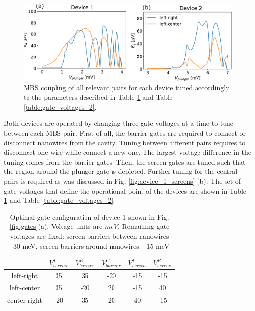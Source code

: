 \begin{figure}[h!]
\centering
  \includegraphics[width=0.8\linewidth]{figures/device_couplings.pdf}
  \caption{MBS coupling of all relevant pairs for each device tuned accordingly to the parameters described in Table \ref{table:gate_voltages_1} and Table \ref{table:gate_voltages_2}.}
  \label{fig:devices_coupling}
\end{figure}

Both devices are operated by changing three gate voltages at a time to tune between each MBS pair.
First of all, the barrier gates are required to connect or disconnect nanowires from the cavity.
Tuning between different pairs requires to disconnect one wire while connect a new one.
The largest voltage difference in the tuning comes from the barrier gates.
Then, the screen gates are tuned such that the region around the plunger gate is depleted.
Further tuning for the central pairs is required as was discussed in Fig. \ref{fig:device_1_screens} (b).
The set of gate voltages that define the operational point of the devices are shown in Table \ref{table:gate_voltages_1} and Table \ref{table:gate_voltages_2}.

\begin{table}[h!]
\centering
\begin{tabular}{||c ||c c c c c ||} 
 \hline
& $V_{barrier}^L$ & $V_{barrier}^R$ & $V_{barrier}^C$ & $V_{screen}^L$ & $V_{screen}^R$ \\
 \hline\hline
 left-right & 35 & 35 & -20 & -15 & -15\\ 
 \hline
 left-center & 35 & -20 & 20 & -15 & 40\\ 
 \hline
 center-right & -20 & 35 & 20 & 40 & -15\\ 
 \hline
 \hline
\end{tabular}
\caption{Optimal gate configuration of device 1 shown in Fig. \ref{fig:gates}(a). Voltage units are $meV$. Remaining gate voltages are fixed: screen barriers between nanowires $-30$ meV, screen barriers around nanowires $-15$ meV.}
\label{table:gate_voltages_1}
\end{table}


